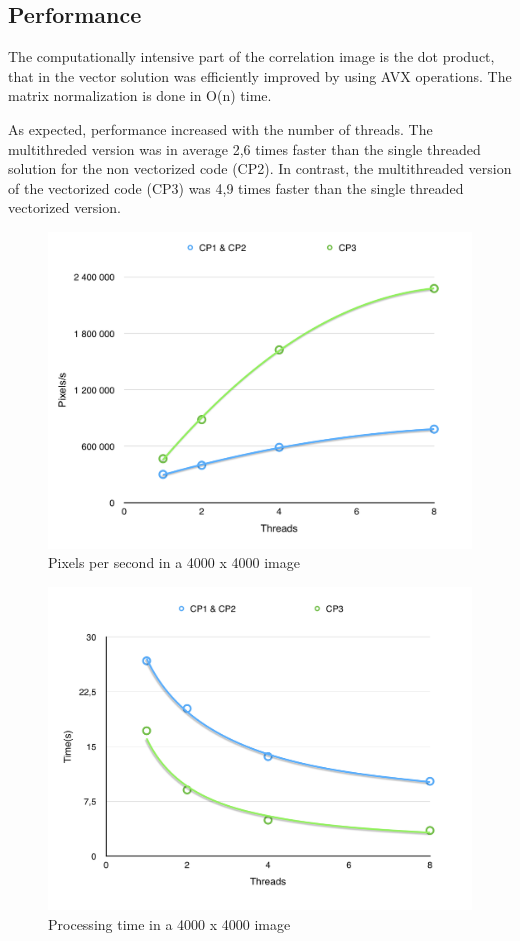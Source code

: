 \documentclass[a4paper,10pt]{article}
\begin{document}
\subsection{Performance}
The computationally intensive part of the correlation image is the dot product, that in the vector solution was efficiently improved by using AVX operations. The matrix normalization is done in O(n) time. 

As expected, performance increased with the number of threads. The multithreded version was in average 2,6 times faster than the single threaded solution for the non vectorized code (CP2). In contrast, the multithreaded version of the vectorized code (CP3) was 4,9 times faster than the single threaded vectorized version.

\begin{figure}[H]
\centering
\includegraphics[width=1\textwidth]{figures/w2_pixels}
\caption{Pixels per second in a 4000 x 4000 image}
\label{fig:pca_type}
\end{figure}

\begin{figure}[H]
\centering
\includegraphics[width=1\textwidth]{figures/w2_time}
\caption{Processing time in a 4000 x 4000 image}
\label{fig:pca_type}
\end{figure}
\end{document}
